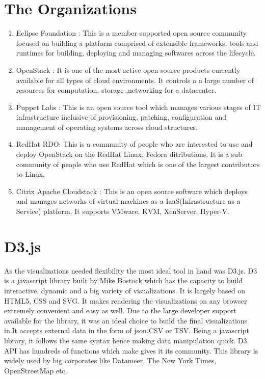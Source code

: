 \documentclass[double,12pt]{beavtex}
\begin{document}
\section{The Organizations}
\begin{enumerate}
\item Eclipse Foundation :
This is a member supported open source community focused on building a platform comprised of extensible frameworks, tools and runtimes for building, deploying and managing softwares across the lifecycle.
\item OpenStack :
It is one of the most active open source products currently available for all types of cloud environments. It controls a a large number of resources for computation, storage ,networking for a datacenter.
\item Puppet Labs :
This is an open source tool which manages various stages of IT infrastructure inclusive of provisioning, patching, configuration and management of operating systems across cloud structures.
\item RedHat RDO:
This is a community of people who are interested to use and deploy OpenStack on the RedHat Linux, Fedora ditributions. It is a sub community of people who use RedHat which is one of the largest contributors to Linux.
\item Citrix Apache Cloudstack :
This is an open source software which deploys and manages networks of virtual machines as a IaaS(Infrastructure as a Service) platform. It supports VMware, KVM, XenServer, Hyper-V.
\end{enumerate}

\section{D3.js}
As the visualizations needed flexibility the most ideal tool in hand was D3.js. D3 is a javascript library built by Mike Bostock which has the capacity to build interactive, dynamic and a big variety of visualizations. It is largely based on HTML5, CSS and SVG. It makes rendering the visualizations on any browser extremely convenient and easy as well. Due to the large developer support available for the library, it was an ideal choice to build the final visualizations in.It accepts external data in the form of json,CSV or TSV. Being a javascript library, it follows the same syntax hence making data manipulation quick. D3 API has hundreds of functions which make gives it its community. This library is widely used by big corporates like Datameer, The New York Times, OpenStreetMap etc.
\end{document}
